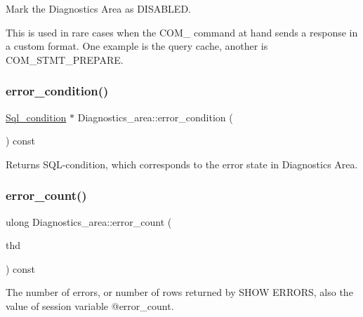 Mark the Diagnostics Area as \textquotesingle{}D\+I\+S\+A\+B\+L\+ED\textquotesingle{}.

This is used in rare cases when the C\+O\+M\+\_\+ command at hand sends a response in a custom format. One example is the query cache, another is C\+O\+M\+\_\+\+S\+T\+M\+T\+\_\+\+P\+R\+E\+P\+A\+RE. \mbox{\label{classDiagnostics__area_ab70c51196734cb073962ca88bc1d9377}} 
\subsubsection{\texorpdfstring{error\+\_\+condition()}{error\_condition()}}
{\footnotesize\ttfamily \mbox{\hyperlink{classSql__condition}{Sql\+\_\+condition}} $\ast$ Diagnostics\+\_\+area\+::error\+\_\+condition (\begin{DoxyParamCaption}{ }\end{DoxyParamCaption}) const}

\begin{DoxyReturn}{Returns}
S\+QL-\/condition, which corresponds to the error state in Diagnostics Area. 
\end{DoxyReturn}
\mbox{\label{classDiagnostics__area_a1e31909ab1b87614b6e7032bd6362760}} 
\subsubsection{\texorpdfstring{error\+\_\+count()}{error\_count()}}
{\footnotesize\ttfamily ulong Diagnostics\+\_\+area\+::error\+\_\+count (\begin{DoxyParamCaption}\item[{T\+HD $\ast$}]{thd }\end{DoxyParamCaption}) const}

The number of errors, or number of rows returned by S\+H\+OW E\+R\+R\+O\+RS, also the value of session variable @error\+\_\+count. \mbox{\label{classDiagnostics__area_afa19c24615d1d20dd20562f3e5e7cb91}} 
